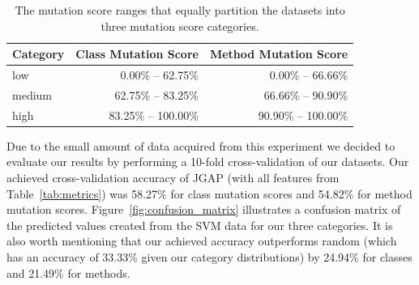 \documentclass[10pt,conference,compsocconf]{IEEEtran}
\begin{document}
\begin{table}[!b]
  \caption{The mutation score ranges that equally partition the datasets into three mutation score categories.}
  \centering
  \begin{tabular}{|l|r|r|}
    \hline
    \rowcolor[RGB]{169,196,223}
    \textbf{Category} & \textbf{Class Mutation Score} & \textbf{Method Mutation Score} \\
    \hline low & 0.00\% -- 62.75\% & 0.00\% -- 66.66\% \\
    \hline medium & 62.75\% -- 83.25\% & 66.66\% -- 90.90\% \\
    \hline high & 83.25\% -- 100.00\% & 90.90\% -- 100.00\% \\
    \hline
  \end{tabular}
  \label{tab:results_details}
\end{table}

Due to the small amount of data acquired from this experiment we decided to evaluate our results by performing a 10-fold cross-validation of our datasets. Our achieved cross-validation accuracy of JGAP (with all features from Table~\ref{tab:metrics}) was 58.27\% for class mutation scores and 54.82\% for method mutation scores. Figure~\ref{fig:confusion_matrix} illustrates a confusion matrix of the predicted values created from the SVM data for our three categories. It is also worth mentioning that our achieved accuracy outperforms random (which has an accuracy of 33.33\% given our category distributions) by 24.94\% for classes and 21.49\% for methods.
\end{document}
